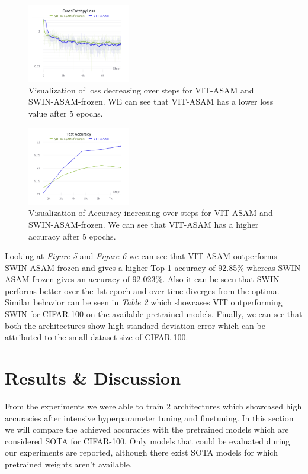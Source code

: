 \documentclass{article}
\begin{document}
\begin{figure}[ht]
    \vskip 0.2in
    \centering
    \includegraphics[width=0.4\textwidth]{cross_entropy_loss.png}
    \caption{Visualization of loss decreasing over steps for VIT-ASAM and SWIN-ASAM-frozen. WE can see that VIT-ASAM has a lower loss value after 5 epochs.}
    \label{fig:foobar}
    \vskip -0.2in
\end{figure}

\begin{figure}[ht]
    \vskip 0.2in
    \centering
    \includegraphics[width=0.4\textwidth]{test_accuracy.png}
    \caption{Visualization of Accuracy increasing over steps for VIT-ASAM and SWIN-ASAM-frozen. We can see that VIT-ASAM has a higher accuracy after 5 epochs.}
    \label{fig:foobar}
    \vskip -0.2in
\end{figure}

Looking at \textit{Figure 5} and \textit{Figure 6} we can see that VIT-ASAM outperforms SWIN-ASAM-frozen and gives a higher Top-1 accuracy of 92.85\% whereas SWIN-ASAM-frozen gives an accuracy of 92.023\%.
Also it can be seen that SWIN performs better over the 1st epoch and over time diverges from the optima.
Similar behavior can be seen in \textit{Table 2} which showcases VIT outperforming SWIN for CIFAR-100 on the available pretrained models.
Finally, we can see that both the architectures show high standard deviation error which can be attributed to the small dataset size of CIFAR-100.


\section{Results \& Discussion}
From the experiments we were able to train 2 architectures which showcased high accuracies after intensive hyperparameter tuning and finetuning.
In this section we will compare the achieved accuracies with the pretrained models which are considered SOTA for CIFAR-100.
Only models that could be evaluated during our experiments are reported, although there exist SOTA models for which pretrained weights aren't available.
\end{document}
